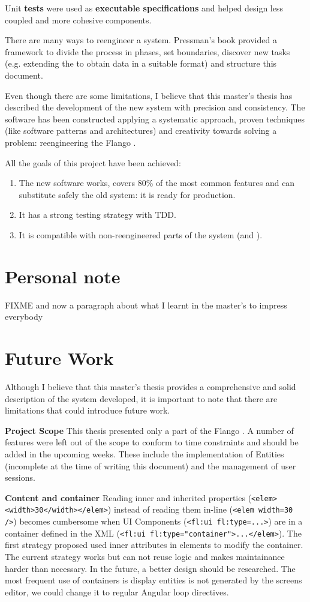 Unit \textbf{tests} were used as \textbf{executable specifications} and helped design less coupled and more cohesive components.

There are many ways to reengineer a system.
Pressman's book provided a framework to divide the process in phases, set boundaries, discover new tasks (e.g. extending the \flangobe to obtain data in a suitable format) and structure this document.

Even though there are some limitations, I believe that this master's thesis has described the development of the new system with precision and consistency.
The software has been constructed applying a systematic approach, proven techniques (like software patterns and architectures) and creativity towards solving a problem: reengineering the Flango \cm .

All the goals of this project have been achieved:
\begin{enumerate}
\item The new software works, covers 80\% of the most common features and can substitute safely the old \flash system: it is ready for production.
\item It has a strong testing strategy with \ac{TDD}.
\item It is compatible with non-reengineered parts of the system (\flangobe and \flangofe).
\end{enumerate}


\section{Personal note}
FIXME and now a paragraph about what I learnt in the master's to impress everybody


\section{Future Work}
Although I believe that this master's thesis provides a comprehensive and solid description of the system developed, it is important to note that there are limitations that could introduce future work.

\textbf{Project Scope} This thesis presented only a part of the Flango \cm . 
A number of features were left out of the scope to conform to time constraints and should be added in the upcoming weeks.
These include the implementation of Entities (incomplete at the time of writing this document) and the management of user sessions.

\textbf{Content and container} Reading inner and inherited properties (\lstinline$<elem><width>30</width></elem>$) instead of reading them in-line (\lstinline$<elem width=30 />$) becomes cumbersome when UI Components (\lstinline$<fl:ui fl:type=...>$) are in a container defined in the \ac{XML} (\lstinline$<fl:ui fl:type="container">...</elem>$).
The first strategy proposed used inner attributes in elements to modify the container.
The current strategy works but can not reuse logic and makes maintainance harder than necessary.
In the future, a better design should be researched.
The most frequent use of containers is display entities is not generated by the screens editor, we could change it to regular Angular loop directives.


